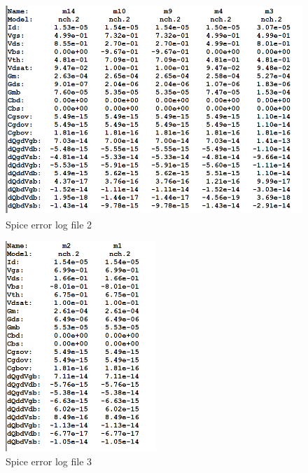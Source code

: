 \documentclass{article}
\begin{document}
\begin{figure}[H]
\centering
\includegraphics[height=300px]{img/q4/error-log/error-log-2.png}
\caption{\label{fig:err-2-q4}Spice error log file 2}
\end{figure}

\begin{figure}[H]
\centering
\includegraphics[height=300px]{img/q4/error-log/error-log-3.png}
\caption{\label{fig:err-3-q4}Spice error log file 3}
\end{figure}
\end{document}
